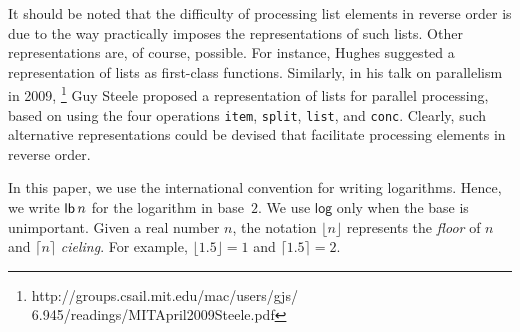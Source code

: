 It should be noted that the difficulty of processing list elements in
reverse order is due to the way \commonlisp{} practically imposes the
representations of such lists.  Other representations are, of course,
possible.  For instance, Hughes \cite{Hughes:1986} suggested a
representation of lists as first-class functions.  Similarly, in his
talk on parallelism in 2009,%
\footnote{http://groups.csail.mit.edu/mac/users/gjs/\\
6.945/readings/MITApril2009Steele.pdf}
Guy Steele proposed a representation of lists for parallel processing,
based on using the four operations \texttt{item}, \texttt{split},
\texttt{list}, and \texttt{conc}.  Clearly, such alternative
representations could be devised that facilitate processing elements
in reverse order.

In this paper, we use the international convention \cite{ISO80000} for
writing logarithms.  Hence, we write $\mathsf{lb}\thinspace n$ for the
logarithm in base~$2$.  We use $\mathsf{log}$ only when the base is
unimportant.
Given a real number $n$, the notation
$\lfloor n \rfloor$ represents the \emph{floor} of $n$ 
and $\lceil n \rceil$ \emph{cieling}. For example, $\lfloor 1.5 \rfloor = 1$
and $\lceil 1.5 \rceil = 2$. 
